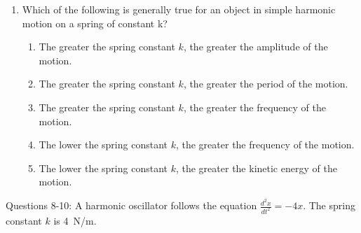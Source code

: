\documentclass[12pt]{article}
\begin{document}
\begin{enumerate}[leftmargin=50pt,label=\underline{\hspace{0.4in}} \arabic*.]
\item Which of the following is generally true for an object in simple
  harmonic motion on a spring of constant k?
  \begin{enumerate}[noitemsep,topsep=0pt]
  \item The greater the spring constant $k$, the greater the amplitude of the
    motion.
  \item The greater the spring constant $k$, the greater the period of the
    motion.
  \item The greater the spring constant $k$, the greater the frequency of the
    motion.
  \item The lower the spring constant $k$, the greater the frequency of the
    motion.
  \item The lower the spring constant $k$, the greater the kinetic energy of
    the motion.
  \end{enumerate}
\end{enumerate}

\noindent Questions 8-10: A harmonic oscillator follows the equation
$\displaystyle \frac{d^2x}{dt^2}=-4x$. The spring constant $k$ is \SI{4}{N/m}.
\end{document}
